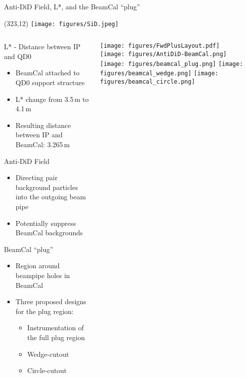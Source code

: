 \documentclass[xcolor={dvipsnames}]{beamer}
\newcommand{\sidlogo}{
  \setlength{\TPHorizModule}{1pt}
  \setlength{\TPVertModule}{1pt}
  \begin{textblock}{1}(323,12)
   \texttt{[image: figures/SiD.jpeg]}
  \end{textblock}
  }
\begin{document}
\begin{frame}{Anti-DiD Field, L*, and the BeamCal ``plug''}
\sidlogo
\begin{columns}
 \begin{column}{0.7\textwidth}
 \alert{L* - Distance between IP and QD0}
  \begin{itemize}
  \item BeamCal attached to QD0 support structure
  \item L* change from 3.5\,m to 4.1\,m
  \item Resulting distance between IP and BeamCal: 3.265\,m
 \end{itemize}
 \alert{Anti-DiD Field}
 \begin{itemize}
  \item Directing pair background particles into the outgoing beam pipe
  \item Potentially suppress BeamCal backgrounds
 \end{itemize}
 \alert{BeamCal ``plug''}
  \begin{itemize}
  \item Region around beampipe holes in BeamCal
  \item Three proposed designs for the plug region:
  \begin{itemize}
   \item Instrumentation of the full plug region
   \item Wedge-cutout
   \item Circle-cutout
  \end{itemize}
 \end{itemize}  
 \end{column}
 \begin{column}{0.35\textwidth}
  \texttt{[image: figures/FwdPlusLayout.pdf]}\\
  \vspace*{0.5cm}
  \texttt{[image: figures/AntiDiD-BeamCal.png]}\\
  \vspace*{0.5cm}
  \texttt{[image: figures/beamcal\_plug.png]}
  \texttt{[image: figures/beamcal\_wedge.png]}
  \texttt{[image: figures/beamcal\_circle.png]}
 \end{column}
\end{columns}

\end{frame}

\end{document}

